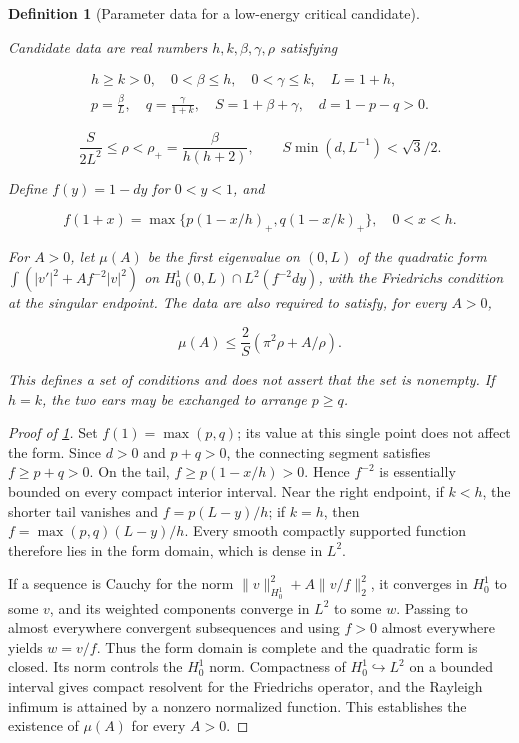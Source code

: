 \documentclass[11pt,a4paper]{article}
\theoremstyle{proofmanuscript}
\newtheorem{definition}[theorem]{Definition}
\begin{document}
\begin{definition}[Parameter data for a low-energy critical candidate]\label{def-candidate}

Candidate data are real numbers \(h,k,\beta,\gamma,\rho\) satisfying

\[
\begin{gathered}
h\ge k>0,\quad0<\beta\le h,\quad0<\gamma\le k,\quad L=1+h,\\
p=\frac\beta L,\quad q=\frac\gamma{1+k},\quad S=1+\beta+\gamma,\quad d=1-p-q>0.
\end{gathered}
\]

\[
\frac S{2L^2}\le\rho<\rho_+=\frac\beta{h(h+2)},\qquad S\min(d,L^{-1})<\sqrt3/2.
\]

Define \(f(y)=1-dy\) for \(0<y<1\), and

\[
f(1+x)=\max\{p(1-x/h)_+,q(1-x/k)_+\},\quad0<x<h.
\]

For \(A>0\), let \(\mu(A)\) be the first eigenvalue on \((0,L)\) of the quadratic form \(\int(|v'|^2+Af^{-2}|v|^2)\) on \(H_0^1(0,L)\cap L^2(f^{-2}dy)\), with the Friedrichs condition at the singular endpoint. The data are also required to satisfy, for every \(A>0\),

\[
\mu(A)\le\frac2S(\pi^2\rho+A/\rho).
\]

This defines a set of conditions and does not assert that the set is nonempty. If \(h=k\), the two ears may be exchanged to arrange \(p\ge q\).

\end{definition}

\begin{proof}[Proof of \ref{def-candidate}]

Set \(f(1)=\max(p,q)\); its value at this single point does not affect the form. Since \(d>0\) and \(p+q>0\), the connecting segment satisfies \(f\ge p+q>0\). On the tail, \(f\ge p(1-x/h)>0\). Hence \(f^{-2}\) is essentially bounded on every compact interior interval. Near the right endpoint, if \(k<h\), the shorter tail vanishes and \(f=p(L-y)/h\); if \(k=h\), then \(f=\max(p,q)(L-y)/h\). Every smooth compactly supported function therefore lies in the form domain, which is dense in \(L^2\).

If a sequence is Cauchy for the norm \(\|v\|_{H_0^1}^2+A\|v/f\|_2^2\), it converges in \(H_0^1\) to some \(v\), and its weighted components converge in \(L^2\) to some \(w\). Passing to almost everywhere convergent subsequences and using \(f>0\) almost everywhere yields \(w=v/f\). Thus the form domain is complete and the quadratic form is closed. Its norm controls the \(H_0^1\) norm. Compactness of \(H_0^1\hookrightarrow L^2\) on a bounded interval gives compact resolvent for the Friedrichs operator, and the Rayleigh infimum is attained by a nonzero normalized function. This establishes the existence of \(\mu(A)\) for every \(A>0\).

\end{proof}
\end{document}
